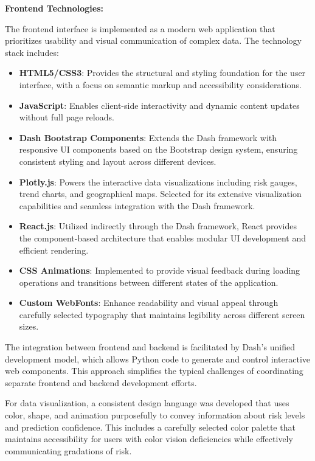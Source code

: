 \documentclass[12pt,a4paper]{report}
\begin{document}
\textbf{Frontend Technologies:}

The frontend interface is implemented as a modern web application that prioritizes usability and visual communication of complex data. The technology stack includes:

\begin{itemize}
    \item \textbf{HTML5/CSS3}: Provides the structural and styling foundation for the user interface, with a focus on semantic markup and accessibility considerations.
    
    \item \textbf{JavaScript}: Enables client-side interactivity and dynamic content updates without full page reloads.
    
    \item \textbf{Dash Bootstrap Components}: Extends the Dash framework with responsive UI components based on the Bootstrap design system, ensuring consistent styling and layout across different devices.
    
    \item \textbf{Plotly.js}: Powers the interactive data visualizations including risk gauges, trend charts, and geographical maps. Selected for its extensive visualization capabilities and seamless integration with the Dash framework.
    
    \item \textbf{React.js}: Utilized indirectly through the Dash framework, React provides the component-based architecture that enables modular UI development and efficient rendering.
    
    \item \textbf{CSS Animations}: Implemented to provide visual feedback during loading operations and transitions between different states of the application.
    
    \item \textbf{Custom WebFonts}: Enhance readability and visual appeal through carefully selected typography that maintains legibility across different screen sizes.
\end{itemize}

The integration between frontend and backend is facilitated by Dash's unified development model, which allows Python code to generate and control interactive web components. This approach simplifies the typical challenges of coordinating separate frontend and backend development efforts.

For data visualization, a consistent design language was developed that uses color, shape, and animation purposefully to convey information about risk levels and prediction confidence. This includes a carefully selected color palette that maintains accessibility for users with color vision deficiencies while effectively communicating gradations of risk.
\end{document}
